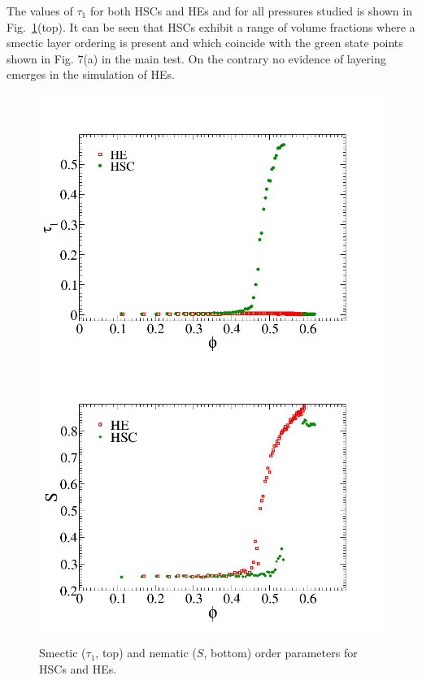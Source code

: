 \documentclass{article}
\begin{document}
The values of $\tau_1$ for both HSCs and HEs and for all pressures studied is shown in Fig.~\ref{fig:ordpars}(top). It can be seen that HSCs exhibit a range of volume fractions where 
a smectic layer ordering is present and which coincide with the green state points shown in Fig. 7(a)
in the main test. On the contrary no evidence of layering emerges in the simulation of HEs.

\begin{figure}
    \centering
    \includegraphics[width=1\columnwidth]{smordpar.png}
    \includegraphics[width=1\columnwidth]{nemop.png}  
    \caption{Smectic ($\tau_1$, top) and nematic ($S$, bottom) order parameters for HSCs and HEs.}
    \label{fig:ordpars}
\end{figure}
\end{document}
